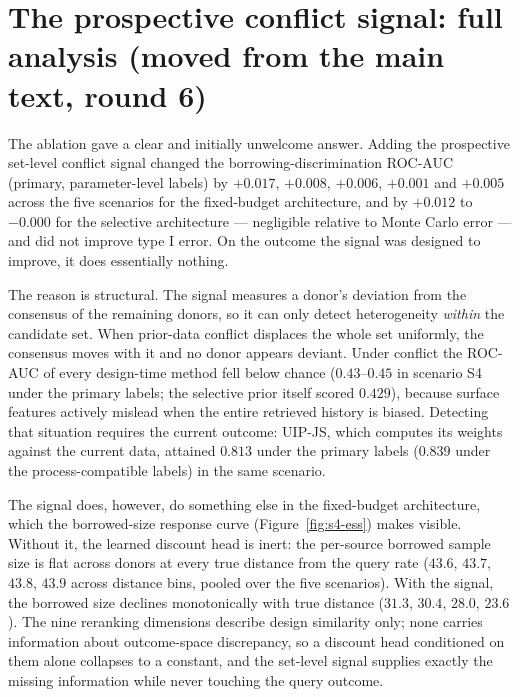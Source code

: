 \documentclass[11pt]{article}
\begin{document}
\section{The prospective conflict signal: full analysis (moved from the
main text, round 6)}

The ablation gave a clear and initially unwelcome answer. Adding the
prospective set-level conflict signal changed the borrowing-discrimination
ROC-AUC (primary, parameter-level labels) by $+0.017$, $+0.008$, $+0.006$,
$+0.001$ and $+0.005$ across the five scenarios for the fixed-budget
architecture, and by $+0.012$ to $-0.000$ for the selective architecture
--- negligible relative to Monte Carlo error --- and did not improve type
I error. On the outcome the signal was designed to improve, it does
essentially nothing.

The reason is structural. The signal measures a donor's deviation from
the consensus of the remaining donors, so it can only detect
heterogeneity \emph{within} the candidate set. When prior-data conflict
displaces the whole set uniformly, the consensus moves with it and no
donor appears deviant. Under conflict the ROC-AUC of every design-time
method fell below chance ($0.43$--$0.45$ in scenario S4 under the primary
labels; the selective prior itself scored $0.429$), because surface
features actively mislead when the entire retrieved history is biased.
Detecting that situation requires the current outcome: UIP-JS, which
computes its weights against the current data, attained $0.813$ under the
primary labels ($0.839$ under the process-compatible labels) in the same
scenario.

The signal does, however, do something else in the fixed-budget
architecture, which the borrowed-size response curve
(Figure~\ref{fig:s4-ess}) makes visible. Without it, the learned discount
head is inert: the per-source borrowed sample size is flat across donors
at every true distance from the query rate ($43.6$, $43.7$, $43.8$,
$43.9$ across distance bins, pooled over the five scenarios). With the
signal, the borrowed size declines monotonically with true distance
($31.3$, $30.4$, $28.0$, $23.6$). The nine reranking dimensions describe
design similarity only; none carries information about outcome-space
discrepancy, so a discount head conditioned on them alone collapses to a
constant, and the set-level signal supplies exactly the missing
information while never touching the query outcome.
\end{document}
